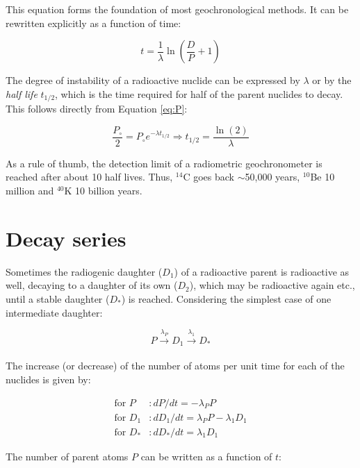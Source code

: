 \documentclass{book}
\begin{document}
This equation forms the foundation of most geochronological
methods. It can be rewritten explicitly as a function of time:

\begin{equation}
t = \frac{1}{\lambda} \ln\left(\frac{D}{P} + 1\right)
\label{eq:t}
\end{equation}

The degree of instability of a radioactive nuclide can be expressed by
$\lambda$ or by the \emph{half life} $t_{1/2}$, which is the time
required for half of the parent nuclides to decay. This follows
directly from Equation \ref{eq:P}:

\begin{equation}
\frac{P_\circ}{2} = P_\circ e^{-\lambda t_{1/2}} 
\Rightarrow t_{1/2} = \frac{\ln(2)}{\lambda}
\label{eq:T12}
\end{equation}

As a rule of thumb, the detection limit of a radiometric
geo\-chro\-no\-me\-ter is reached after about 10 half lives. Thus,
$^{14}$C goes back $\sim$50,000 years, $^{10}$Be 10 million and
$^{40}$K 10 billion years.

\section{Decay series}
\label{sec:decay-series}

Sometimes the radiogenic daughter ($D_1$) of a radioactive parent is
radioactive as well, decaying to a daughter of its own ($D_2$), which
may be radioactive again etc., until a stable daughter ($D_*$) is
reached. Considering the simplest case of one intermediate daughter:

\begin{equation}
P \xrightarrow[]{\lambda_P} D_1 \xrightarrow[]{\lambda_1} D_*
\label{eq:series}
\end{equation}

The increase (or decrease) of the number of atoms per unit time for
each of the nuclides is given by:

\begin{align}
\mbox{for~} P &: dP/dt = -\lambda_P P\\
\mbox{for~} D_1 &: dD_1/dt = \lambda_P P - \lambda_1 D_1 \label{eq:D1}\\
\mbox{for~} D_* &: dD_*/dt = \lambda_1 D_1 \label{eq:D*}
\end{align}

The number of parent atoms $P$ can be written as a function of $t$:
\end{document}
